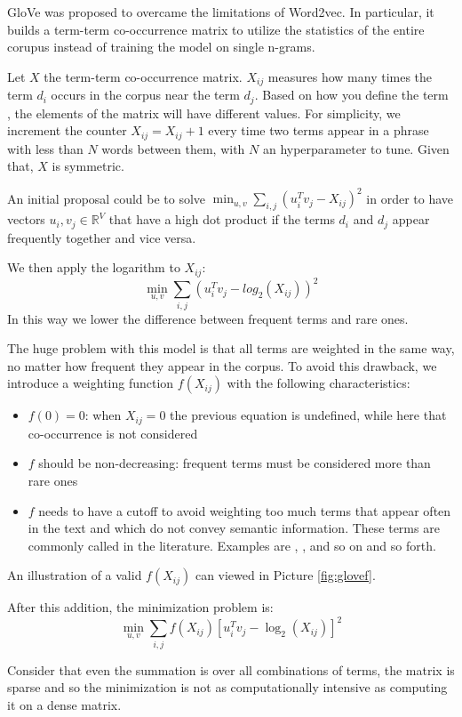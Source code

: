 GloVe was proposed to overcame the limitations of Word2vec.
In particular, it builds a term-term co-occurrence matrix
to utilize the statistics of the entire corupus
instead of training the model on single n-grams.

Let  $X$ the term-term co-occurrence matrix.
$X_{ij}$ measures how many times the term $d_i$ occurs in the corpus near
the term $d_j$. Based on how you define the term ,
the elements of the matrix will have different values.
For simplicity, we increment the counter $X_{ij} = X_{ij} + 1$ every time
two terms appear in a phrase with less than $N$ words between them, with $N$ an
hyperparameter to tune. Given that, $X$ is symmetric.

An initial proposal could be to solve $\min_{u,v} \sum_{i,j} (u_i^T v_j - X_{ij})^2$
in order to have vectors $u_i, v_j \in \mathbb{R}^V$ that have a high dot product if the terms $d_i$ and $d_j$
appear frequently together and vice versa.

We then apply the logarithm to $X_{ij}$:
$$\min_{u,v} \sum_{i,j} (u_i^T v_j - log_2(X_{ij}))^2$$
In this way we lower the difference between frequent terms and rare ones.

The huge problem with this model is that all terms are weighted in the same way,
no matter how frequent they appear in the corpus.
To avoid this drawback, we introduce a weighting function $f(X_{ij})$ with the following characteristics:
\begin{itemize}
    \item $f(0) = 0$: when $X_{ij} = 0$ the previous equation is undefined, while here that co-occurrence is not considered
    \item $f$ should be non-decreasing: frequent terms must be considered more than rare ones
    \item $f$ needs to have a cutoff to avoid weighting too much terms that appear often in the text and which do not convey semantic information.
          These terms are commonly called  in the literature. Examples are , ,  and so on and so forth.
\end{itemize}
An illustration of a valid $f(X_{ij})$ can viewed in Picture \ref{fig:glovef}.

After this addition, the minimization problem is:
$$ \min_{u,v} \sum_{i,j} f(X_{ij}) [u_i^T v_j - \log_2(X_{ij})]^2 $$

Consider that even the summation is over all combinations of terms,
the matrix is sparse and so the minimization is not as computationally intensive
as computing it on a dense matrix.

